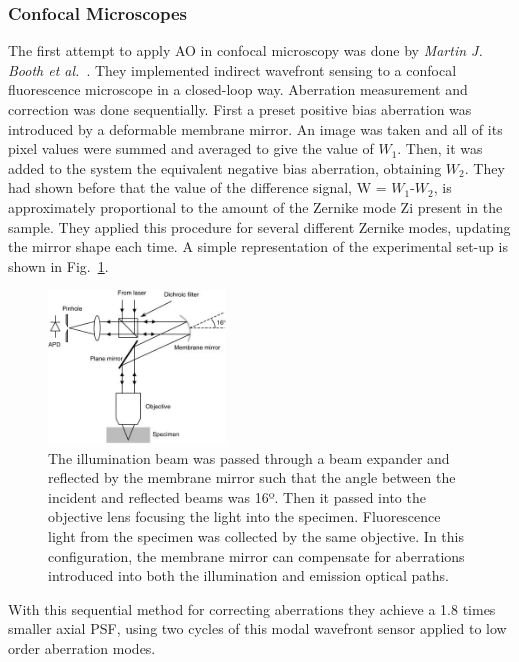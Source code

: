 \subsubsection{Confocal Microscopes}
\label{sec:ConfocalMicroscopes}

The first attempt to apply AO in confocal microscopy was done by \textit{Martin J. Booth et al.}~\cite{scan_CFM}. They implemented indirect wavefront sensing to a confocal fluorescence microscope in a closed-loop way. Aberration measurement and correction was done sequentially. First a preset positive bias aberration was introduced by a deformable membrane mirror. An image was taken and all of its pixel values were summed and averaged to give the value of $W_1$. Then, it was added to the system the equivalent negative bias aberration, obtaining $W_2$. They had shown before that the value of the difference signal, W = $W_1$-$W_2$, is approximately proportional to the amount of the Zernike mode Zi present in the sample. They applied this procedure for several different Zernike modes, updating the mirror shape each time. A simple representation of the experimental set-up is shown in Fig.~\ref{fig:AOM_scan_CFM}.

\begin{figure}[htbp]
	\centering
		\includegraphics[width=0.42\textwidth,height=0.22\textheight]{images/AOM_scan_CFM.jpg}
		\caption{The illumination beam was passed through a beam expander and reflected by the membrane mirror such that the angle between the incident and reflected beams was 16º. Then it passed into the objective lens focusing the light into the specimen. Fluorescence light from the specimen was collected by the same objective. In this configuration, the membrane mirror can compensate for aberrations introduced into both the illumination and emission optical paths.}
	\label{fig:AOM_scan_CFM}
\end{figure}
  
With this sequential method for correcting aberrations they achieve a 1.8 times smaller axial PSF, using two cycles of this modal wavefront sensor applied to low order aberration modes.

